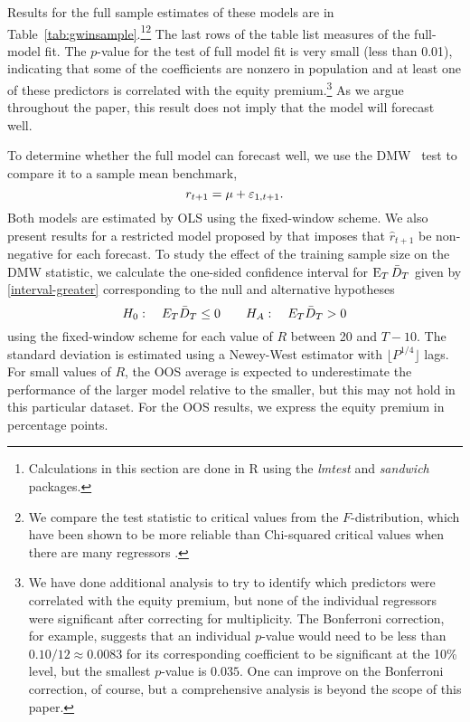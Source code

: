 \documentclass[12pt,draft]{article}
\begin{document}
Results for the full sample estimates of these models are in
Table~\ref{tab:gwinsample}.\footnote{%
  Calculations in this section are done in R \citep{Rde:10} using the
  \emph{lmtest} \citep{ZeH:02} and \emph{sandwich} \citep{Zei:04}
  packages.}\footnote{%
  We compare the test statistic to critical values from the
  $F$-distribution, which have been shown to be more reliable than
  Chi-squared critical values when there are many regressors
  \citep{Ana:12,Cal:11c}.} %
The last rows of the table list measures of the full-model fit.  The
$p$-value for the test of full model fit is very small (less than
0.01), indicating that some of the coefficients are nonzero in
population and at least one of these predictors is correlated with the
equity premium.\footnote{%
  We have done additional analysis to try to identify which predictors
  were correlated with the equity premium, but none of the individual
  regressors were significant after correcting for multiplicity. The
  Bonferroni correction, for example, suggests that an individual
  $p$-value would need to be less than $0.10/12 \approx 0.0083$ for
  its corresponding coefficient to be significant at the 10\% level,
  but the smallest $p$-value is $0.035$. One can improve on the
  Bonferroni correction, of course, but a comprehensive analysis is
  beyond the scope of this paper.} %
As we argue throughout the paper, this result does not imply that the
model will forecast well.

To determine whether the full model can forecast well, we use the DMW
\oost\ test to compare it to a sample mean benchmark,
\begin{equation*}
r_{t+1} = \mu + \varepsilon_{1,t+1}.
\end{equation*}
Both models are estimated by OLS using the fixed-window scheme. We
also present results for a restricted model proposed by
\citet{CaT:08} that imposes that $\hat r_{t+1}$ be non-negative for
each forecast.
To study the effect of the training sample size on the DMW statistic, we
calculate the one-sided confidence interval for $\operatorname{E}_T \bar{D}_{T}$ given
by \eqref{interval-greater} corresponding to the null and alternative
hypotheses
\[ H_0: \quad E_T \bar{D}_{T} \leq 0 \qquad
H_A: \quad E_T \bar{D}_{T} > 0
\]
using the fixed-window scheme for each value of $R$ between 20 and
$T-10$. The standard deviation is estimated using a Newey-West
estimator with $\lfloor P^{1/4}\rfloor$ lags.  For small values of
$R$, the OOS average is expected to underestimate the performance of
the larger model relative to the smaller, but this may not hold in
this particular dataset. For the OOS results, we express the equity
premium in percentage points.
\end{document}
